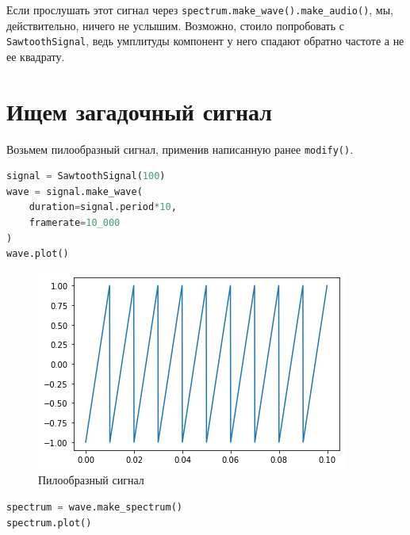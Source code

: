 \documentclass[a4paper,12pt]{report}
\begin{document}
    Если прослушать этот сигнал через \texttt{spectrum.make\_wave().make\_audio()}, мы, действительно, ничего не услышим. Возможно, стоило попробовать с \texttt{SawtoothSignal}, ведь умплитуды компонент у него спадают обратно частоте а не ее квадрату.
    
    \chapter{Ищем загадочный сигнал}

    Возьмем пилообразный сигнал, применив написанную ранее \texttt{modify()}.
    
\begin{lstlisting}[language=Python,caption=Новый сигнал]
signal = SawtoothSignal(100)
wave = signal.make_wave(
    duration=signal.period*10, 
    framerate=10_000
)
wave.plot()
\end{lstlisting}

    \begin{figure}[H]
        \centering
        \includegraphics[width=\textwidth]{ex6_first.png}
        \caption{Пилообразный сигнал}
        \label{fig:ex6_first}
    \end{figure}
    
\begin{lstlisting}[language=Python,caption=Его спектр]
spectrum = wave.make_spectrum()
spectrum.plot()
\end{lstlisting}
\end{document}
